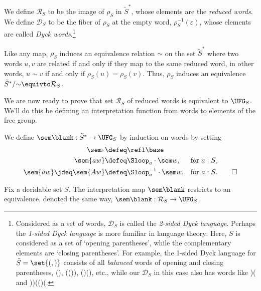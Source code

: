 \begin{definition}
  We define $\mathcal R_S$ to be the image of $\rho_S$ in $\tilde S^*$,
  whose elements are the \emph{reduced words}.
  We define $\mathcal D_S$ to be the fiber of $\rho_S$ at the empty word,
  $\rho_S^{-1}(\varepsilon)$,
  whose elements are called \emph{Dyck words}.\footnote{%
    Considered as a set of words,
    $\mathcal D_S$ is called the \emph{2-sided Dyck language}.
    Perhaps the \emph{1-sided Dyck language} is more familiar
    in language theory: Here, $S$ is considered as a set of
    `opening parentheses', while the complementary elements
    are `closing parentheses'.
    For example, the 1-sided Dyck language for $\tilde S=\set{\textup{(},\textup{)}}$
    consists of all \emph{balanced} words of opening and closing parentheses,
    \eg (), (()), ()(), etc., while our $\mathcal D_S$ in this case
    also has words like )( and ))(()(.}
\end{definition}

\begin{remark}
  Like any map, $\rho_S$ induces an equivalence relation $\sim$
  on the set $\tilde S^*$
  where two words $u,v$ are related
  if and only if they map to the same reduced word,
  in other words,
  $u \sim v$ if and only if $\rho_S(u) = \rho_S(v)$.
  Thus, $\rho_S$ induces an equivalence $\tilde S^*/{\sim} \equivto \mathcal R_S$.
\end{remark}

We are now ready to prove that set $\mathcal R_S$ of reduced words
is equivalent to $\UFG_S$.
We'll do this be defining an interpretation function from words
to elements of the free group.

\begin{definition}
  We define $\sem\blank : \tilde S^* \to \UFG_S$
  by induction on words by setting
  \begin{align*}
    \sem\varepsilon             &\defeq \refl\base & & \\
    \sem{aw}                    &\defeq \Sloop_a \cdot \sem w,
                                &\text{for $a:S$,}& \\
    \sem{\bar aw}\jdeq \sem{Aw} &\defeq \Sloop_a^{-1} \cdot \sem w,
                                &\text{for $a:S$.}&\qedhere
  \end{align*}
\end{definition}

\begin{theorem}
  Fix a decidable set $S$.
  The interpretation map $\sem\blank$ restricts to
  an equivalence, denoted the same way,
  $\sem\blank : \mathcal R_S \to \UFG_S$.
\end{theorem}


